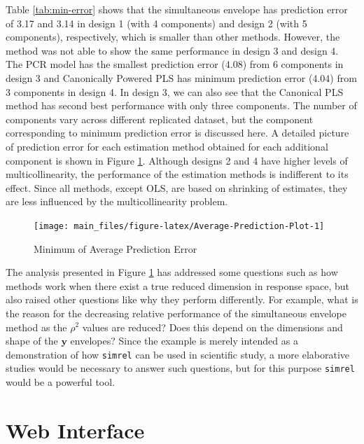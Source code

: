 \documentclass[review]{elsarticle}
\theoremstyle{definition}
\theoremstyle{definition}
\theoremstyle{definition}
\theoremstyle{remark}
\begin{document}
Table \ref{tab:min-error} shows that the simultaneous envelope has
prediction error of 3.17 and 3.14 in design 1 (with 4 components) and
design 2 (with 5 components), respectively, which is smaller than other
methods. However, the method was not able to show the same performance
in design 3 and design 4. The PCR model has the smallest prediction
error (4.08) from 6 components in design 3 and Canonically Powered PLS
has minimum prediction error (4.04) from 3 components in design 4. In
design 3, we can also see that the Canonical PLS method has second best
performance with only three components. The number of components vary
across different replicated dataset, but the component corresponding to
minimum prediction error is discussed here. A detailed picture of
prediction error for each estimation method obtained for each additional
component is shown in Figure \ref{fig:Average-Prediction-Plot}. Although
designs 2 and 4 have higher levels of multicollinearity, the performance
of the estimation methods is indifferent to its effect. Since all
methods, except OLS, are based on shrinking of estimates, they are less
influenced by the multicollinearity problem.

\begin{figure}[!htb]
\texttt{[image: main\_files/figure-latex/Average-Prediction-Plot-1]} \caption{Minimum of Average Prediction Error}\label{fig:Average-Prediction-Plot}
\end{figure}

The analysis presented in Figure \ref{fig:Average-Prediction-Plot} has
addressed some questions such as how methods work when there exist a
true reduced dimension in response space, but also raised other
questions like why they perform differently. For example, what is the
reason for the decreasing relative performance of the simultaneous
envelope method as the \(\rho^2\) values are reduced? Does this depend
on the dimensions and shape of the \(\mathbf{y}\) envelopes? Since the
example is merely intended as a demonstration of how \texttt{simrel} can
be used in scientific study, a more elaborative studies would be
necessary to answer such questions, but for this purpose \texttt{simrel}
would be a powerful tool.

\hypertarget{web-interface}{\section{Web
Interface}\label{web-interface}}
\end{document}
